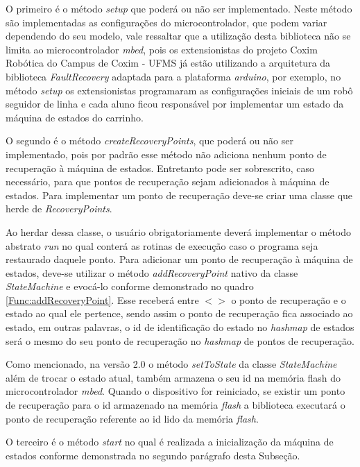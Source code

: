 O primeiro é o método \textit{setup} que poderá ou não ser implementado. Neste método são implementadas as configurações do microcontrolador, que podem variar dependendo do seu modelo, vale ressaltar que a utilização desta biblioteca não se limita ao microcontrolador \textit{mbed}, pois os extensionistas do projeto Coxim Robótica do Campus de Coxim - UFMS já estão utilizando a arquitetura da biblioteca \textit{FaultRecovery} adaptada para a plataforma \textit{arduino}, por exemplo, no método \textit{setup} os extensionistas programaram as configurações iniciais de um robô seguidor de linha e cada aluno ficou responsável por implementar um estado da máquina de estados do carrinho.

O segundo é o método \textit{createRecoveryPoints}, que poderá ou não ser implementado, pois por padrão esse método não adiciona nenhum ponto de recuperação à máquina de estados. Entretanto pode ser sobrescrito, caso necessário, para que pontos de recuperação sejam adicionados à máquina de estados. Para implementar um ponto de recuperação deve-se criar uma classe que herde de \textit{RecoveryPoints}. 

Ao herdar dessa classe, o usuário obrigatoriamente deverá implementar o método abstrato \textit{run} no qual conterá as rotinas de execução caso o programa seja restaurado daquele ponto. Para adicionar um ponto de recuperação à máquina de estados, deve-se utilizar o método \textit{addRecoveryPoint} nativo da classe \textit{StateMachine} e evocá-lo conforme demonstrado no quadro \autoref{Func:addRecoveryPoint}. Esse receberá entre $< >$ o ponto de recuperação e o estado ao qual ele pertence, sendo assim o ponto de recuperação fica associado ao estado, em outras palavras, o id de identificação do estado no \textit{hashmap} de estados será o mesmo do seu ponto de recuperação no \textit{hashmap} de pontos de recuperação.

Como mencionado, na versão 2.0 o método \textit{setToState} da classe \textit{StateMachine} além de trocar o estado atual, também armazena o seu id na memória flash do microcontrolador \textit{mbed}. Quando o dispositivo for reiniciado, se existir um ponto de recuperação para o id armazenado na memória \textit{flash} a biblioteca executará o ponto de recuperação referente ao id lido da memória \textit{flash}.

O terceiro é o método \textit{start} no qual é realizada a inicialização da máquina de estados conforme demonstrada no segundo parágrafo desta Subseção.

